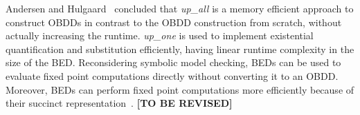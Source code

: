 \documentclass{vldb}
\newcommand{\tbr}{\textbf{[TO BE REVISED]}}
\begin{document}
Andersen and Hulgaard~\cite{ANDERSEN97} concluded that \textit{up\_all} is a
memory efficient approach to construct OBDDs in contrast to the OBDD construction
from scratch, without actually increasing the runtime. \textit{up\_one} is used
to implement existential quantification and substitution efficiently, having
linear runtime complexity in the size of the BED. Reconsidering symbolic model
checking, BEDs can be used to evaluate fixed point computations directly without
converting it to an OBDD. Moreover, BEDs can perform fixed point computations more
efficiently because of their succinct representation~\cite{ANDERSEN97}. \tbr




\end{document}
